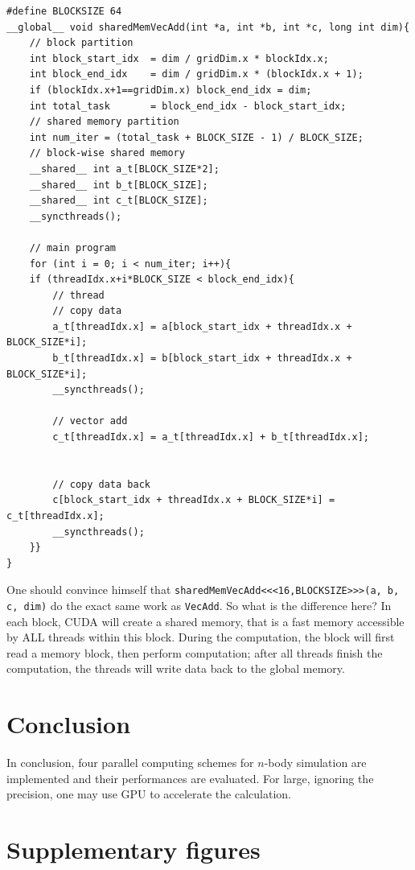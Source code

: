 \documentclass[twoside,12pt]{article}
\theoremstyle{definition}
\theoremstyle{remark}
\begin{document}
\begin{lstlisting}[style=cpp]
#define BLOCKSIZE 64
__global__ void sharedMemVecAdd(int *a, int *b, int *c, long int dim){
    // block partition
    int block_start_idx  = dim / gridDim.x * blockIdx.x;
    int block_end_idx    = dim / gridDim.x * (blockIdx.x + 1);
    if (blockIdx.x+1==gridDim.x) block_end_idx = dim;
    int total_task       = block_end_idx - block_start_idx;
    // shared memory partition
    int num_iter = (total_task + BLOCK_SIZE - 1) / BLOCK_SIZE;
    // block-wise shared memory
    __shared__ int a_t[BLOCK_SIZE*2];
    __shared__ int b_t[BLOCK_SIZE];
    __shared__ int c_t[BLOCK_SIZE];
    __syncthreads();

    // main program
    for (int i = 0; i < num_iter; i++){
    if (threadIdx.x+i*BLOCK_SIZE < block_end_idx){
        // thread
        // copy data
        a_t[threadIdx.x] = a[block_start_idx + threadIdx.x + BLOCK_SIZE*i];
        b_t[threadIdx.x] = b[block_start_idx + threadIdx.x + BLOCK_SIZE*i];
        __syncthreads();

        // vector add
        c_t[threadIdx.x] = a_t[threadIdx.x] + b_t[threadIdx.x];


        // copy data back
        c[block_start_idx + threadIdx.x + BLOCK_SIZE*i] = c_t[threadIdx.x];
        __syncthreads();
    }}
}
\end{lstlisting}
One should convince himself that \lstinline|sharedMemVecAdd<<<16,BLOCKSIZE>>>(a, b, c, dim)|
do the exact same work as \lstinline|VecAdd|.
So what is the difference here?
In each block, CUDA will create a shared memory, that is a fast memory accessible
by ALL threads within this block.
During the computation, the block will first read a memory block,
then perform computation; after all threads finish the computation,
the threads will write data back to the global memory.


\section{Conclusion}
In conclusion, four parallel computing schemes for $n$-body simulation 
are implemented and their performances are evaluated.
For large, ignoring the precision, one may use GPU to accelerate
the calculation.


\appendix

\newpage
\section{Supplementary figures}
\end{document}
